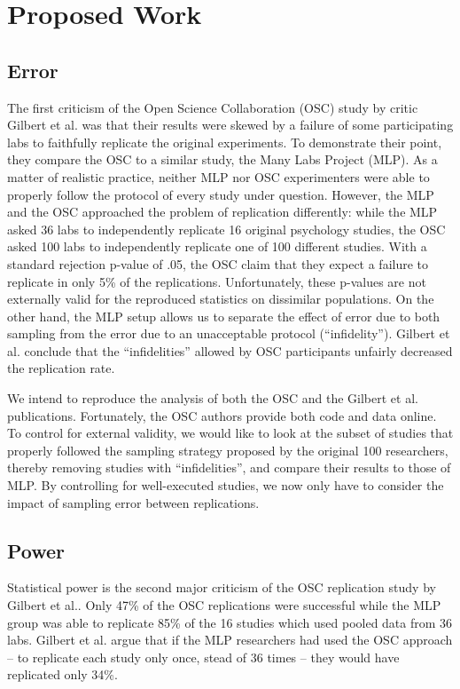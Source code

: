 \documentclass{article}
\begin{document}
\section{Proposed Work}
\subsection{Error}
The first criticism of the Open Science Collaboration (OSC) study by critic Gilbert et al. was that their results were skewed by a failure of some participating labs to faithfully replicate the original experiments. To demonstrate their point, they compare the OSC to a similar study, the Many Labs Project (MLP). As a matter of realistic practice, neither MLP nor OSC experimenters were able to properly follow the protocol of every study under question. However, the MLP and the OSC approached the problem of replication differently: while the MLP asked 36 labs to independently replicate 16 original psychology studies, the OSC asked 100 labs to independently replicate one of 100 different studies. With a standard rejection p-value of .05, the OSC claim that they expect a failure to replicate in only 5\% of the replications. Unfortunately, these p-values are not externally valid for the reproduced statistics on dissimilar populations. On the other hand, the MLP setup allows us to separate the effect of error due to both sampling from the error due to an unacceptable protocol (“infidelity”). Gilbert et al. conclude that the “infidelities” allowed by OSC participants unfairly decreased the replication rate.

We intend to reproduce the analysis of both the OSC and the Gilbert et al. publications. Fortunately, the OSC authors provide both code and data online. To control for external validity, we would like to look at the subset of studies that properly followed the sampling strategy proposed by the original 100 researchers, thereby removing studies with “infidelities”, and compare their results to those of MLP. By controlling for well-executed studies, we now only have to consider the impact of sampling error between replications.


\subsection{Power}
Statistical power is the second major criticism of the OSC replication study by Gilbert et al.. Only 47\% of the OSC replications were successful while the MLP group was able to replicate 85\% of the 16 studies which used pooled data from 36 labs. Gilbert et al. argue that if the MLP researchers had used the OSC approach -- to replicate each study only once, stead of 36 times -- they would have replicated only 34\%.
\end{document}
